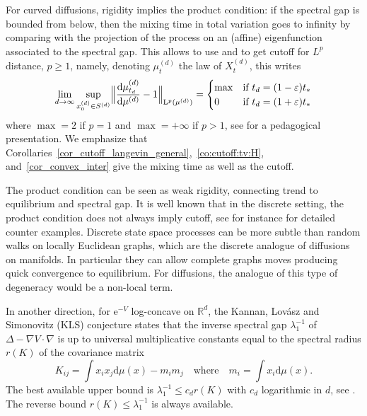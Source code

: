 \documentclass[10pt,reqno]{amsart}
\numberwithin{equation}{section}
\begin{document}
For curved diffusions, rigidity implies the product condition: if the spectral
gap is bounded from below, then the mixing time in total variation goes to
infinity by comparing with the projection of the process on an (affine)
eigenfunction associated to the spectral gap. This allows to use
\cite[Th.~3.3]{MR2375599} and \cite[Cor.~1]{salez-2025} to get cutoff for
$L^p$ distance, $p\geq1$, namely, denoting $\mu^{(d)}_t$ the law of
$X^{(d)}_t$, this writes
\begin{equation}\label{eq:Lp}
    \lim_{d\to\infty}
    \sup_{x^{(d)}_0\in S^{(d)}}
    \Bigl\|\frac{\mathrm{d}\mu^{(d)}_{t_d}}{\mathrm{d}\mu^{(d)}}-1\Bigr\|_{\mathrm{L}^p(\mu^{(d)})}
    =
    \begin{cases}
      \max & \text{if $t_d=(1-\varepsilon)t_*$}\\
      0 & \text{if $t_d=(1+\varepsilon)t_*$}
    \end{cases}
\end{equation}
where $\max=2$ if $p=1$ and $\max=+\infty$ if $p>1$, see \cite{blog-saloff}
for a pedagogical presentation. We emphasize that
Corollaries~\ref{cor_cutoff_langevin_general},~\ref{co:cutoff:tv:H},
and~\ref{cor_convex_inter} give the mixing time as well as the cutoff.

The product condition can be seen as weak rigidity, connecting trend to equilibrium and spectral gap. 
It is well known that in the discrete setting, the product condition does not always imply cutoff, see for instance \cite{MR2375599} for detailed counter examples. Discrete state space processes can be more subtle than random walks on locally Euclidean graphs, which are the discrete analogue of diffusions on manifolds. In particular they can allow complete graphs moves producing quick convergence to equilibrium. For diffusions, the analogue of this type of degeneracy would be a non-local term. 

In another direction, for $\mathrm{e}^{-V}$ log-concave on $\mathbb{R}^d$, the
Kannan, Lovász and Simonovitz (KLS) conjecture states that the inverse
spectral gap $\lambda_1^{-1}$ of $\Delta-\nabla V\cdot\nabla$ is up to
universal multiplicative constants equal to the spectral radius $r(K)$ of the
covariance matrix
\[
K_{ij}=\int x_ix_j\mathrm{d}\mu(x)-m_im_j
\quad\text{where}\quad
m_i=\int x_i\mathrm{d}\mu(x).
\]
The best available upper bound is $\lambda_1^{-1}\leq c_d r(K)$ with $c_d$
logarithmic in $d$, see \cite{klartag}. The reverse bound
$r(K)\leq\lambda_1^{-1}$ is always available.
\end{document}
